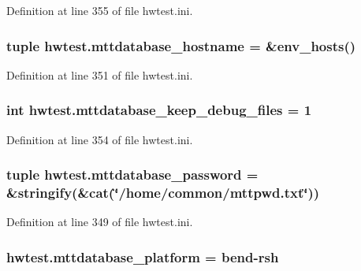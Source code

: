 Definition at line 355 of file hwtest.\-ini.

\hypertarget{namespacehwtest_a2561ee660a1987af3681c21d61bce282}{
\subsubsection[{mttdatabase\-\_\-hostname}]{\setlength{\rightskip}{0pt plus 5cm}tuple hwtest.\-mttdatabase\-\_\-hostname = \&env\-\_\-hosts()}}\label{namespacehwtest_a2561ee660a1987af3681c21d61bce282}


Definition at line 351 of file hwtest.\-ini.

\hypertarget{namespacehwtest_a4038849f56dda68ae47f22d2945ddf21}{
\subsubsection[{mttdatabase\-\_\-keep\-\_\-debug\-\_\-files}]{\setlength{\rightskip}{0pt plus 5cm}int hwtest.\-mttdatabase\-\_\-keep\-\_\-debug\-\_\-files = 1}}\label{namespacehwtest_a4038849f56dda68ae47f22d2945ddf21}


Definition at line 354 of file hwtest.\-ini.

\hypertarget{namespacehwtest_a62683e098488d08966d4a339bb945d9c}{
\subsubsection[{mttdatabase\-\_\-password}]{\setlength{\rightskip}{0pt plus 5cm}tuple hwtest.\-mttdatabase\-\_\-password = \&stringify(\&cat(\char`\"{}/home/common/mttpwd.\-txt\char`\"{}))}}\label{namespacehwtest_a62683e098488d08966d4a339bb945d9c}


Definition at line 349 of file hwtest.\-ini.

\hypertarget{namespacehwtest_afe5c3aa0d87e5e74558741e81b9d39ce}{
\subsubsection[{mttdatabase\-\_\-platform}]{\setlength{\rightskip}{0pt plus 5cm}hwtest.\-mttdatabase\-\_\-platform = bend-\/rsh}}\label{namespacehwtest_afe5c3aa0d87e5e74558741e81b9d39ce}


